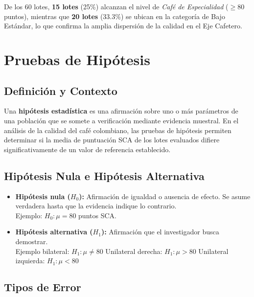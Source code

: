 \documentclass[12pt,a4paper]{article}
\begin{document}
De los 60 lotes, \textbf{15 lotes} (25\%) alcanzan el nivel de \textit{Café de Especialidad} ($\geq 80$ puntos), mientras que \textbf{20 lotes} (33.3\%) se ubican en la categoría de Bajo Estándar, lo que confirma la amplia dispersión de la calidad en el Eje Cafetero.

\section{Pruebas de Hipótesis}

\subsection{Definición y Contexto}

Una \textbf{hipótesis estadística} es una afirmación sobre uno o más parámetros de una población
que se somete a verificación mediante evidencia muestral. En el análisis de la calidad del café
colombiano, las pruebas de hipótesis permiten determinar si la media de puntuación SCA de los
lotes evaluados difiere significativamente de un valor de referencia establecido.

\subsection{Hipótesis Nula e Hipótesis Alternativa}

\begin{itemize}[leftmargin=1.5cm]
  \item \textbf{\textcolor{cafeoscuro}{Hipótesis nula} ($H_0$):} Afirmación de igualdad o ausencia
    de efecto. Se asume verdadera hasta que la evidencia indique lo contrario. \\
    Ejemplo: $H_0: \mu = 80$ puntos SCA.

  \item \textbf{\textcolor{cafemedio}{Hipótesis alternativa} ($H_1$):} Afirmación que el
    investigador busca demostrar. \\
    Ejemplo bilateral: $H_1: \mu \neq 80$ \quad
    Unilateral derecha: $H_1: \mu > 80$ \quad
    Unilateral izquierda: $H_1: \mu < 80$
\end{itemize}

\subsection{Tipos de Error}
\end{document}
